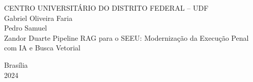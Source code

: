 \begin{center}
{\ABNTEXchapterfont\large CENTRO UNIVERSITÁRIO DO DISTRITO FEDERAL -- UDF}\\
\vspace{2cm}
{\ABNTEXchapterfont\Large Gabriel Oliveira Faria\\Pedro Samuel\\Zandor Duarte}
\vspace{3cm}
{\ABNTEXchapterfont\Large Pipeline RAG para o SEEU: Modernização da Execução Penal com IA e Busca Vetorial}
\vspace{6cm}
\end{center}
\begin{flushright}
Brasília\\
2024
\end{flushright}
